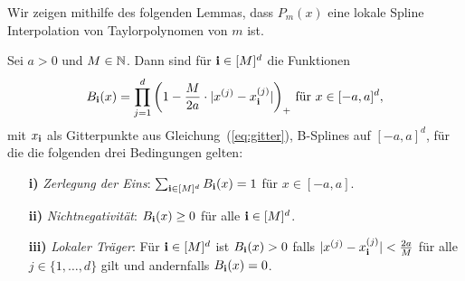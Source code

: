 Wir zeigen mithilfe des folgenden Lemmas, dass $P_m(x)$ eine lokale Spline Interpolation von Taylorpolynomen von $m$ ist.
\begin{lem}
\label{lem:loccon}
Sei $a >0$ und $M \in \mathbb{N}$. Dann sind für $\mathbf{i} \in [M]^d$ die Funktionen 
$$B_{\mathbf{i}}(x) = \prod_{j = 1}^{d} \bigg(1 - \frac{M}{2a} \cdot |x^{(j)} - x_{\mathbf{i}}^{(j)}|\bigg)_+ \text{ für } x \in [-a, a]^d,$$
mit $x_{\mathbf{i}}$ als Gitterpunkte aus Gleichung~(\ref{eq:gitter}), B-Splines auf $[-a, a]^d$, für die die folgenden drei Bedingungen gelten:
\begin{itemize}
\item[\textbf{i)}] \emph{Zerlegung der Eins}: $\sum_{\mathbf{i} \in [M]^d} B_{\mathbf{i}}(x) = 1$ für $x \in [-a, a]$.
\item[\textbf{ii)}] \emph{Nichtnegativität}: $B_{\mathbf{i}}(x) \geq 0$ für alle $\mathbf{i} \in [M]^d$.
\item[\textbf{iii)}] \emph{Lokaler Träger}: Für $\mathbf{i} \in [M]^d$ ist $B_{\mathbf{i}}(x) > 0$ falls $|x^{(j)} - x_{\mathbf{i}}^{(j)}| < \frac{2a}{M}$ für alle $j \in \{1,\dots,d\}$ gilt und andernfalls $B_{\mathbf{i}}(x) = 0$.
\end{itemize}
\end{lem}
